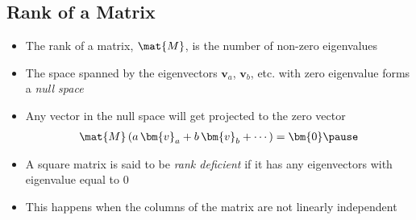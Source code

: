 \begin{slide}
\section[-1]{Rank of a Matrix}

\begin{PauseHighLight}
  \begin{itemize}
  \item The rank of a matrix, $\mat{M}$, is the number of non-zero
    eigenvalues\pause
  \item The space spanned by the eigenvectors $\bm{v}_a$, $\bm{v}_b$,
    etc.{} with zero eigenvalue forms a \emph{null space}\pause
  \item Any vector in the null space will get projected to the zero
    vector
    \begin{align*}
      \mat{M} \, (a\, \bm{v}_a + b \, \bm{v}_b + \cdots) = \bm{0}\pause
    \end{align*}
  \item A square matrix is said to be \emph{rank deficient} if it has
    any eigenvectors with eigenvalue equal to 0\pause
   \item This happens when the columns of the matrix are not linearly independent\pause
 \end{itemize}
\end{PauseHighLight}

\end{slide}


